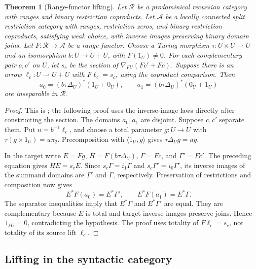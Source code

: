 \documentclass[11pt]{article}
\newtheorem{theorem}{Theorem}[section]
\begin{document}
\begin{theorem}[Range-functor lifting]\label{thm:local-lifting}
Let $\mathscr R$ be a prodominical recursion category with ranges and
binary restriction coproducts. Let $\mathcal A$ be a locally connected
split restriction category with ranges, restriction zeros, and binary
restriction coproducts, satisfying weak choice, with inverse images
preserving binary domain joins. Let
$F:\mathscr R\to\mathcal A$ be a range functor.
Choose a Turing morphism $\tau:U\times U\rightharpoonup U$ and
an isomorphism $b:U\to U+U$, with $F(1_U)\ne0$.
For each complementary pair $c,c'$ on $U$, let $s_c$ be the section
of $\nabla_{FU}(Fc'+Fc)$. Suppose there is an arrow
$\ell_c:U\rightharpoonup U+U$ with $F\ell_c=s_c$, using the coproduct
comparison. Then
\[
 a_0=(b\tau\Delta_U)^*(1_U+0_U),\qquad
 a_1=(b\tau\Delta_U)^*(0_U+1_U)
\]
are inseparable in $\mathscr R$.
\end{theorem}
\begin{proof}
This is \cite[Theorem 4.7]{LOC}; the following proof uses the
inverse-image laws directly after constructing the section.
The domains $a_0,a_1$ are disjoint. Suppose $c,c'$ separate them.
Put $u=b^{-1}\ell_c$, and choose a total parameter $g:U\to U$ with
$\tau(g\times1_U)=u\pi_2$. Precomposition with $\langle1_U,g\rangle$
gives $\tau\Delta_Ug=ug$.

In the target write $E=Fg$, $H=F(b\tau\Delta_U)$, $\Gamma=Fc$,
and $\Gamma'=Fc'$. The preceding equation gives $HE=s_cE$.
Since $s_c\Gamma=i_1\Gamma$ and $s_c\Gamma'=i_0\Gamma'$,
its inverse images of the summand domains are $\Gamma'$ and $\Gamma$,
respectively. Preservation of restrictions and composition now gives
\[
 E^*F(a_0)=E^*\Gamma',\qquad E^*F(a_1)=E^*\Gamma.
\]
The separator inequalities imply that $E^*\Gamma$ and $E^*\Gamma'$
are equal. They are complementary because $E$ is total and target
inverse images preserve joins. Hence $1_{FU}=0$, contradicting the
hypothesis. The proof uses totality of $F\ell_c=s_c$, not totality of
its source lift $\ell_c$.
\end{proof}

\subsection{Lifting in the syntactic category}
\end{document}
